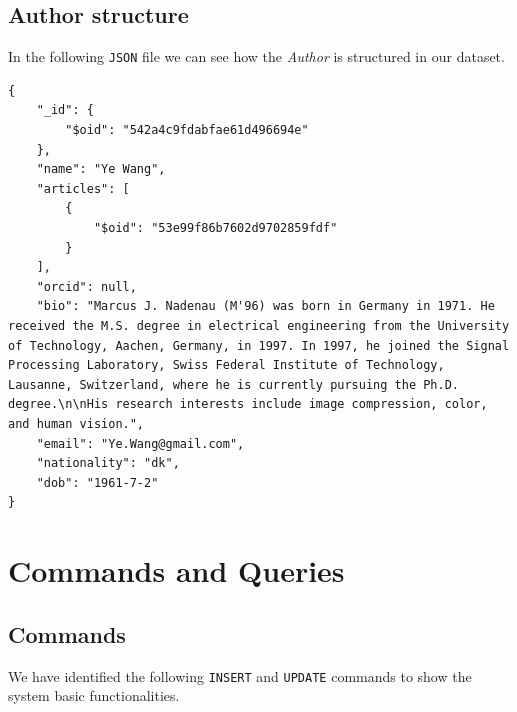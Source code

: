 \documentclass{Configuration_Files/PoliMi3i_thesis}
\begin{document}
\section{Author structure}
In the following \verb |JSON| file we can see how the \emph{Author} is structured in our dataset.\newline
\begin{lstlisting}
{
	"_id": {
		"$oid": "542a4c9fdabfae61d496694e"
	},
	"name": "Ye Wang",
	"articles": [
		{
			"$oid": "53e99f86b7602d9702859fdf"
		}
	],
	"orcid": null,
	"bio": "Marcus J. Nadenau (M'96) was born in Germany in 1971. He received the M.S. degree in electrical engineering from the University of Technology, Aachen, Germany, in 1997. In 1997, he joined the Signal Processing Laboratory, Swiss Federal Institute of Technology, Lausanne, Switzerland, where he is currently pursuing the Ph.D. degree.\n\nHis research interests include image compression, color, and human vision.",
	"email": "Ye.Wang@gmail.com",
	"nationality": "dk",
	"dob": "1961-7-2"
}
\end{lstlisting}


\chapter{Commands and Queries}
\label{ch:ceq}
\section{Commands}
We have identified the following \verb |INSERT| and \verb |UPDATE| commands to show the system basic functionalities.
\end{document}
